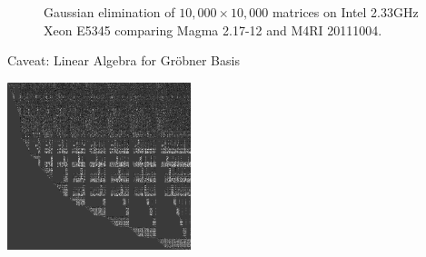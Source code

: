 \documentclass[11pt]{beamer}
\begin{document}
\begin{frame}[fragile]
\begin{figure}[htbp]
\begin{center}
\begin{tikzpicture}[xscale=0.035,yscale=0.7]
\end{tikzpicture}
\caption{Gaussian elimination of $10,000 \times 10,000$ matrices on Intel 2.33GHz Xeon E5345 comparing Magma 2.17-12 and M4RI 20111004.}
\label{fig:sparse-m4ri}
\end{center}
\end{figure}
\end{frame}

\begin{frame}{Caveat: Linear Algebra for Gröbner Basis}
\begin{center}
 \includegraphics[width=0.4\textwidth]{./hfe25_scaled.png}
\end{center}



\end{frame}
\end{document}

